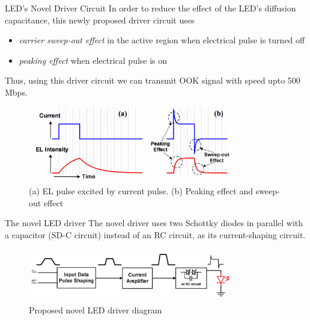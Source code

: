 \documentclass[mathserif]{beamer}
\begin{document}
    
    \begin{frame}{LED's Novel Driver Circuit}
        \pause In order to reduce the effect of the LED's diffusion capacitance, this newly proposed driver circuit uses
        \begin{itemize}
            \pause \item \emph{carrier sweep-out effect} in the active region when electrical pulse is turned off
            \pause \item \emph{peaking effect} when electrical pulse is on
        \end{itemize}
        Thus, using this driver circuit we can transmit OOK signal with speed upto 500 Mbps.  

        \pause
        \begin{figure}
             \centering
             \includegraphics[width=0.8\textwidth]{peakingAndSweepOut.png}
             \caption{(a) EL pulse excited by current pulse. (b) Peaking effect and sweep-out effect}
        \end{figure}
    \end{frame}
    
    
    \begin{frame}{The novel LED driver}
        \pause
        The novel driver uses two Schottky diodes in parallel with a capacitor (SD-C circuit) instead of an RC circuit, as its current-shaping circuit.
        \pause
        \begin{figure}
            \centering
            \includegraphics[width=0.8\textwidth]{novelLEDDriver.png}
            \caption{Proposed novel LED driver diagram}
        \end{figure}
    \end{frame}
\end{document}
